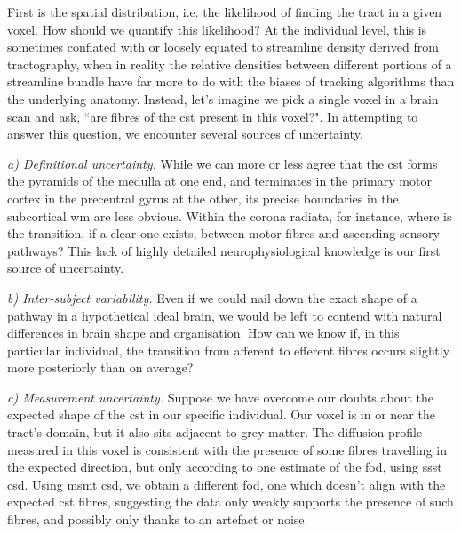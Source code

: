 First is the spatial distribution, i.e. the likelihood of finding the tract in a given voxel.
How should we quantify this likelihood?
At the individual level, this is sometimes conflated with or loosely equated to streamline density derived from tractography, when in reality the relative densities between different portions of a streamline bundle have far more to do with the biases of tracking algorithms than the underlying anatomy.
Instead, let's imagine we pick a single \gls{voxel} in a brain scan and ask, ``are fibres of the \gls{cst} present in this voxel?".
In attempting to answer this question, we encounter several sources of uncertainty.

\textit{a) Definitional uncertainty.}
While we can more or less agree that the \gls{cst} forms the pyramids of the medulla at one end, and terminates in the primary motor cortex in the precentral gyrus at the other, its precise boundaries in the subcortical \gls{wm} are less obvious.
Within the corona radiata, for instance, where is the transition, if a clear one exists, between motor fibres and ascending sensory pathways?
This lack of highly detailed neurophysiological knowledge is our first source of uncertainty.

\textit{b) Inter-subject variability.}
Even if we could nail down the exact shape of a pathway in a hypothetical ideal brain, we would be left to contend with natural differences in brain shape and organisation.
How can we know if, in this particular individual, the transition from afferent to efferent fibres occurs slightly more posteriorly than on average?

\textit{c) Measurement uncertainty.}
Suppose we have overcome our doubts about the expected shape of the \gls{cst} in our specific individual.
Our voxel is in or near the tract's domain, but it also sits adjacent to grey matter.
The diffusion profile measured in this voxel is consistent with the presence of some fibres travelling in the expected direction, but only according to one estimate of the \gls{fod}, using \gls{ssst} \gls{csd}.
Using \gls{msmt} \gls{csd}, we obtain a different \gls{fod}, one which doesn't align with the expected \gls{cst} fibres, suggesting the data only weakly supports the presence of such fibres, and possibly only thanks to an artefact or noise.

